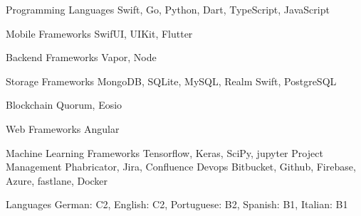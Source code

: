 

\begin{cvskills}

\cvskill
{Programming Languages} %
{Swift, Go, Python, Dart, TypeScript, JavaScript} %
\vspace{0.4cm}

\cvskill
{Mobile Frameworks} %
{SwifUI, UIKit, Flutter} %
\vspace{0.4cm}

\cvskill
{Backend Frameworks} %
{Vapor, Node} %
\vspace{0.4cm}

\cvskill
{Storage Frameworks} %
{MongoDB, SQLite, MySQL, Realm Swift, PostgreSQL} %
\vspace{0.4cm}

\cvskill
{Blockchain} %
{Quorum, Eosio} %
\vspace{0.4cm}

\cvskill
{Web Frameworks} %
{Angular} %
\vspace{0.4cm}

\cvskill
{Machine Learning Frameworks} %
{Tensorflow, Keras, SciPy, jupyter} %
\vspace{0.4cm}
\cvskill
{Project Management} %
{Phabricator, Jira, Confluence} %
\vspace{0.4cm}
\cvskill
{Devops} %
{Bitbucket, Github, Firebase, Azure, fastlane, Docker} %
\vspace{0.4cm}


\cvskill
{Languages} %
{German: C2, English: C2, Portuguese: B2, Spanish: B1, Italian: B1} %


\end{cvskills}